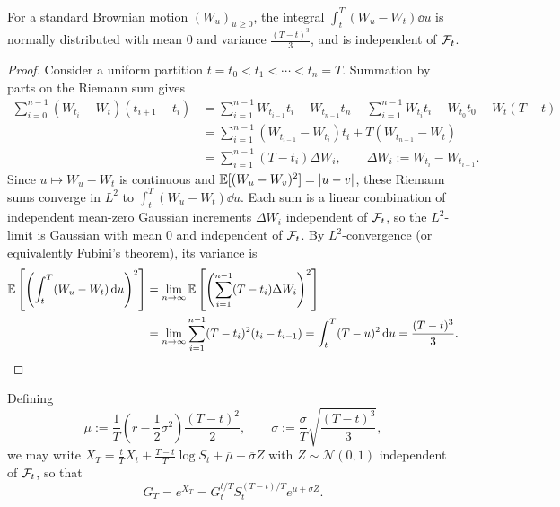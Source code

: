 \begin{lemma}\label{lem:bm-integral}
    For a standard Brownian motion $(W_u)_{u \ge 0}$, the integral $\int_t^T (W_u - W_t)\dd u$ is normally distributed with mean $0$ and variance $\frac{(T - t)^3}{3}$, and is independent of $\mathcal{F}_t$.
\end{lemma}
\begin{proof}
    Consider a uniform partition $t = t_0 < t_1 < \cdots < t_n = T$. Summation by parts on the Riemann sum gives
    \[
    \begin{aligned}
        \sum_{i=0}^{n-1}(W_{t_i} - W_t)(t_{i+1} - t_i)
        &= \sum_{i=1}^{n-1} W_{t_{i-1}} t_i + W_{t_{n-1}} t_n - \sum_{i=1}^{n-1} W_{t_i} t_i - W_{t_0} t_0 - W_t(T - t) \\
        &= \sum_{i=1}^{n-1}(W_{t_{i-1}} - W_{t_i})t_i + T(W_{t_{n-1}} - W_t) \\
        &= \sum_{i=1}^{n-1}(T - t_i)\Delta W_i, \qquad \Delta W_i := W_{t_i} - W_{t_{i-1}}.
    \end{aligned}
    \]
    Since $u \mapsto W_u - W_t$ is continuous and $\mathbb{E}[(W_u - W_v)^2] = |u - v|$, these Riemann sums converge in $L^2$ to $\int_t^T (W_u - W_t)\dd u$. Each sum is a linear combination of independent mean-zero Gaussian increments $\Delta W_i$ independent of $\mathcal{F}_t$, so the $L^2$-limit is Gaussian with mean $0$ and independent of $\mathcal{F}_t$. By $L^2$-convergence (or equivalently Fubini's theorem), its variance is
    \begin{align*}
        \mathbb{E}\left[\left(\int_t^T (W_u - W_t)\,\mathrm{d} u\right)^2\right]
        &= \lim_{n \to \infty}\mathbb{E}\left[\left(\sum_{i=1}^{n-1}(T - t_i)\Delta W_i\right)^2\right] \\
        &= \lim_{n \to \infty}\sum_{i=1}^{n-1}(T - t_i)^2 (t_i - t_{i-1})
         = \int_t^T (T - u)^2 \,\mathrm{d} u = \frac{(T - t)^3}{3}. \qedhere
    \end{align*}
\end{proof}

Defining
\[
\overline{\mu} := \frac{1}{T}\left(r - \frac{1}{2}\sigma^2\right)\frac{(T - t)^2}{2}, \qquad \overline{\sigma} := \frac{\sigma}{T}\sqrt{\frac{(T - t)^3}{3}},
\]
we may write $X_T = \frac{t}{T}X_t + \frac{T - t}{T}\log S_t + \overline{\mu} + \overline{\sigma} Z$ with $Z \sim \mathcal{N}(0, 1)$ independent of $\mathcal{F}_t$, so that
\[
G_T = e^{X_T} = G_t^{t/T} S_t^{(T-t)/T} e^{\overline{\mu} + \overline{\sigma} Z}.
\]

